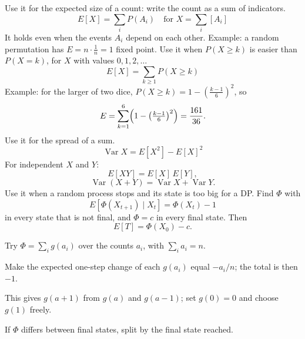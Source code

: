 \label{mathprob}
{\footnotesize\tightdisplay
{}
Use it for the expected size of a count: write the count as a sum of indicators.
\[ E[X] = \sum_i P(A_i) \quad \text{for } X = \sum_i [A_i] \]
It holds even when the events $A_i$ depend on each other.
Example: a random permutation has $E = n \cdot \frac{1}{n} = 1$ fixed point.
Use it when $P(X \ge k)$ is easier than $P(X = k)$, for $X$ with values $0, 1, 2, \dots$
\[ E[X] = \sum_{k \ge 1} P(X \ge k) \]
Example: for the larger of two dice, $P(X \ge k) = 1 - (\frac{k-1}{6})^2$, so
\[ E = \sum_{k=1}^{6} \Bigl(1 - \bigl(\tfrac{k-1}{6}\bigr)^2\Bigr) = \frac{161}{36}. \]
Use it for the spread of a sum.
\[ \operatorname{Var} X = E[X^2] - E[X]^2 \]
For independent $X$ and $Y$:
\[ E[XY] = E[X]\,E[Y], \]
\[ \operatorname{Var}(X + Y) = \operatorname{Var} X + \operatorname{Var} Y. \]
Use it when a random process stops and its state is too big for a DP.
Find $\Phi$ with
\[ E[\Phi(X_{t+1}) \mid X_t] = \Phi(X_t) - 1 \]
in every state that is not final, and $\Phi = c$ in every final state. Then
\[ E[T] = \Phi(X_0) - c. \]
\begin{facts}
	\item Try $\Phi = \sum_i g(a_i)$ over the counts $a_i$, with $\sum_i a_i = n$.
	\item Make the expected one-step change of each $g(a_i)$ equal $-a_i / n$; the total is then $-1$.
	\item This gives $g(a+1)$ from $g(a)$ and $g(a-1)$; set $g(0) = 0$ and choose $g(1)$ freely.
	\item If $\Phi$ differs between final states, split by the final state reached.

\end{facts}}
